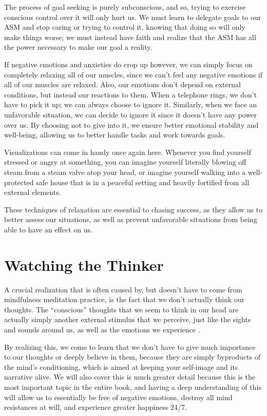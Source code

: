 \documentclass[
]{book}
\begin{document}
The process of goal seeking is purely subconscious, and so, trying to exercise conscious control over it will only hurt us. We must learn to delegate goals to our ASM and stop caring or trying to control it, knowing that doing so will only make things worse; we must instead have faith and realize that the ASM has all the power necessary to make our goal a reality.

If negative emotions and anxieties do crop up however, we can simply focus on completely relaxing all of our muscles, since we can't feel any negative emotions if all of our muscles are relaxed. Also, our emotions don't depend on external conditions, but instead our reactions to them. When a telephone rings, we don't have to pick it up; we can always choose to ignore it. Similarly, when we face an unfavorable situation, we can decide to ignore it since it doesn't have any power over us. By choosing not to give into it, we ensure better emotional stability and well-being, allowing us to better handle tasks and work towards goals.

Visualizations can come in handy once again here. Whenever you find yourself stressed or angry at something, you can imagine yourself literally blowing off steam from a steam valve atop your head, or imagine yourself walking into a well-protected safe house that is in a peaceful setting and heavily fortified from all external elements.

These techniques of relaxation are essential to chasing success, as they allow us to better assess our situations, as well as prevent unfavorable situations from being able to have an effect on us.

\hypertarget{watching-the-thinker}{%
\section{Watching the Thinker}\label{watching-the-thinker}}

A crucial realization that is often caused by, but doesn't have to come from mindfulness meditation practice, is the fact that we don't actually think our thoughts. The ``conscious'' thoughts that we seem to think in our head are actually simply another external stimulus that we perceive, just like the sights and sounds around us, as well as the emotions we experience \citep{thoughts}.

By realizing this, we come to learn that we don't have to give much importance to our thoughts or deeply believe in them, because they are simply byproducts of the mind's conditioning, which is aimed at keeping your self-image and its narrative alive. We will also cover this is much greater detail because this is the most important topic in the entire book, and having a deep understanding of this will allow us to essentially be free of negative emotions, destroy all mind resistances at will, and experience greater happiness 24/7.
\end{document}
